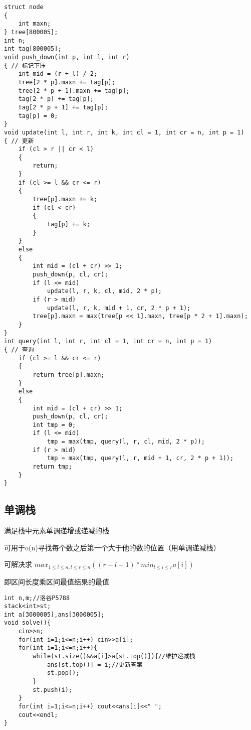 \documentclass[]{article}
\begin{document}
\begin{verbatim}
struct node
{
    int maxn;
} tree[800005];
int n;
int tag[800005];
void push_down(int p, int l, int r)
{ // 标记下压
    int mid = (r + l) / 2;
    tree[2 * p].maxn += tag[p];
    tree[2 * p + 1].maxn += tag[p];
    tag[2 * p] += tag[p];
    tag[2 * p + 1] += tag[p];
    tag[p] = 0;
}
void update(int l, int r, int k, int cl = 1, int cr = n, int p = 1)
{ // 更新
    if (cl > r || cr < l)
    {
        return;
    }
    if (cl >= l && cr <= r)
    {
        tree[p].maxn += k;
        if (cl < cr)
        {
            tag[p] += k;
        }
    }
    else
    {
        int mid = (cl + cr) >> 1;
        push_down(p, cl, cr);
        if (l <= mid)
            update(l, r, k, cl, mid, 2 * p);
        if (r > mid)
            update(l, r, k, mid + 1, cr, 2 * p + 1);
        tree[p].maxn = max(tree[p << 1].maxn, tree[p * 2 + 1].maxn);
    }
}
int query(int l, int r, int cl = 1, int cr = n, int p = 1)
{ // 查询
    if (cl >= l && cr <= r)
    {
        return tree[p].maxn;
    }
    else
    {
        int mid = (cl + cr) >> 1;
        push_down(p, cl, cr);
        int tmp = 0;
        if (l <= mid)
            tmp = max(tmp, query(l, r, cl, mid, 2 * p));
        if (r > mid)
            tmp = max(tmp, query(l, r, mid + 1, cr, 2 * p + 1));
        return tmp;
    }
}
\end{verbatim}

\hypertarget{ux5355ux8c03ux6808}{%
\subsection{单调栈}\label{ux5355ux8c03ux6808}}

满足栈中元素单调递增或递减的栈

可用于o(n)寻找每个数之后第一个大于他的数的位置（用单调递减栈）

可解决求
\(max_{1\leq l\leq n,l\leq r \leq n}((r-l+1)*min_{l\leq i \leq r}a[i])\)

即区间长度乘区间最值结果的最值

\begin{verbatim}
int n,m;//洛谷P5788
stack<int>st;
int a[3000005],ans[3000005];
void solve(){
    cin>>n;
    for(int i=1;i<=n;i++) cin>>a[i];
    for(int i=1;i<=n;i++){
        while(st.size()&&a[i]>a[st.top()]){//维护递减栈
            ans[st.top()] = i;//更新答案
            st.pop();
        }
        st.push(i);
    }
    for(int i=1;i<=n;i++) cout<<ans[i]<<" ";
    cout<<endl;
}
\end{verbatim}
\end{document}
